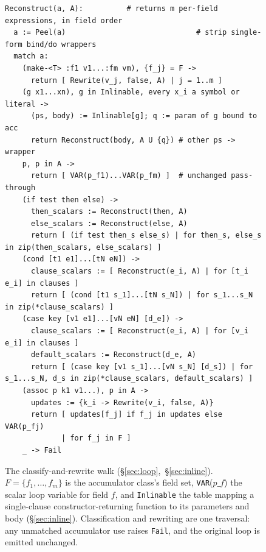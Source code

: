 \documentclass[sigplan,screen,review,anonymous]{acmart}
\begin{document}
\begin{figure}[t]
\begin{lstlisting}[language={},basicstyle=\fontsize{8pt}{9pt}\selectfont\ttfamily,numbers=none,frame=single,columns=fullflexible,keepspaces=true,keywordstyle={}]
Reconstruct(a, A):          # returns m per-field expressions, in field order
  a := Peel(a)                              # strip single-form bind/do wrappers
  match a:
    (make-<T> :f1 v1...:fm vm), {f_j} = F ->
      return [ Rewrite(v_j, false, A) | j = 1..m ]
    (g x1...xn), g in Inlinable, every x_i a symbol or literal ->
      (ps, body) := Inlinable[g]; q := param of g bound to acc
      return Reconstruct(body, A U {q}) # other ps -> wrapper
    p, p in A ->
      return [ VAR(p_f1)...VAR(p_fm) ]  # unchanged pass-through
    (if test then else) ->
      then_scalars := Reconstruct(then, A)
      else_scalars := Reconstruct(else, A)
      return [ (if test then_s else_s) | for then_s, else_s in zip(then_scalars, else_scalars) ]
    (cond [t1 e1]...[tN eN]) ->
      clause_scalars := [ Reconstruct(e_i, A) | for [t_i e_i] in clauses ]
      return [ (cond [t1 s_1]...[tN s_N]) | for s_1...s_N in zip(*clause_scalars) ]
    (case key [v1 e1]...[vN eN] [d_e]) ->
      clause_scalars := [ Reconstruct(e_i, A) | for [v_i e_i] in clauses ]
      default_scalars := Reconstruct(d_e, A)
      return [ (case key [v1 s_1]...[vN s_N] [d_s]) | for s_1...s_N, d_s in zip(*clause_scalars, default_scalars) ]
    (assoc p k1 v1...), p in A ->
      updates := {k_i -> Rewrite(v_i, false, A)}
      return [ updates[f_j] if f_j in updates else VAR(p_fj)
             | for f_j in F ]
    _ -> Fail
\end{lstlisting}
\caption{The classify-and-rewrite walk (\S\ref{sec:loop},~\S\ref{sec:inline}).
$F=\{f_1,\dots,f_m\}$ is the accumulator class's field set, \texttt{VAR}($p\_f$)
the scalar loop variable for field $f$, and \texttt{Inlinable} the table mapping
a single-clause constructor-returning function to its parameters and body
(\S\ref{sec:inline}). Classification and rewriting are one traversal: any
unmatched accumulator use raises \texttt{Fail}, and the original
loop is emitted unchanged.}
\label{fig:algo}
\end{figure}
\end{document}
